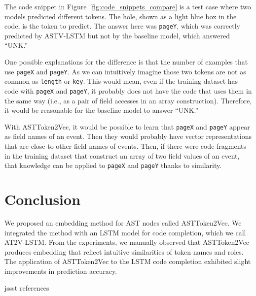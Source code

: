 \documentclass[E]{compsoft}
\begin{document}
The code snippet in Figure~\ref{fig:code_snippets_compare} is a test case where two models predicted different tokens.  The hole, shown as a light blue box in the code, is the token to predict.  The answer here was \texttt{pageY}, which was correctly predicted by ASTV-LSTM but not by the baseline model, which answered ``UNK.''  

One possible explanations for the difference is that the number of examples that use \texttt{pageX} and \texttt{pageY}.  As we can intuitively imagine those two tokens are not as common as \texttt{length} or \texttt{key}.  This would mean, even if the training dataset has code with \texttt{pageX} and \texttt{pageY}, it probably does not have the code that uses them in the same way (i.e., as a pair of field accesses in an array construction).  Therefore, it would be reasonable for the baseline model to answer ``UNK.'' 

With ASTToken2Vec, it would be possible to learn that \texttt{pageX} and \texttt{pageY} appear as field names of an event.  Then they would probably have vector representations that are close to other field names of events.  Then, if there were code fragments in the training dataset that construct an array of two field values of an event, that knowledge can be applied to \texttt{pageX} and \texttt{pageY} thanks to similarity.




\section{Conclusion}
We proposed an embedding method for AST nodes called ASTToken2Vec. 
We integrated the method with an LSTM model for code completion, which we call AT2V-LSTM.
From the experiments, we manually observed that ASTToken2Vec produces embedding that reflect intuitive similarities of token names and roles.
The application of ASTToken2Vec to the LSTM code completion exhibited slight improvements in prediction accuracy. %



 {jssst}
 {references}
\end{document}
